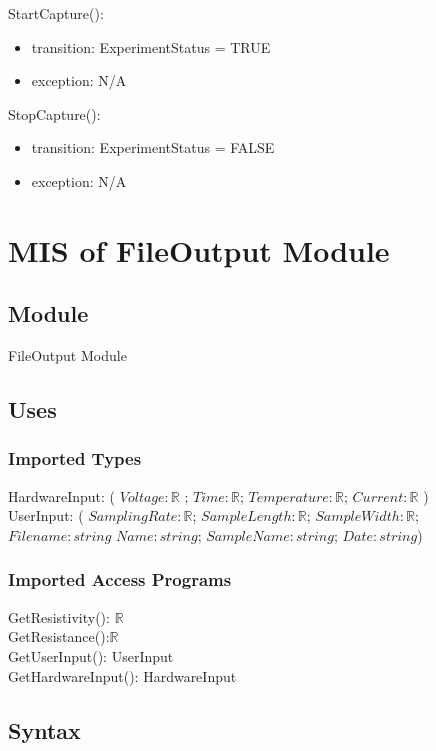 \documentclass[12pt, titlepage]{article}
\begin{document}
\noindent StartCapture():
\begin{itemize}
\item transition: ExperimentStatus = TRUE
\item exception: N/A
\end{itemize}

\noindent StopCapture():
\begin{itemize}
\item transition: ExperimentStatus = FALSE
\item exception: N/A
\end{itemize}

\newpage

\section{MIS of FileOutput Module} \label{FO} 

\subsection{Module}

FileOutput Module

\subsection{Uses}

\subsubsection{Imported Types}

HardwareInput: ( $Voltage: \mathbb{R} $ ; $Time: \mathbb{R}$; $Temperature: \mathbb{R}$; $Current: \mathbb{R}$ )\\
UserInput: ( $SamplingRate: \mathbb{R}$; $SampleLength: \mathbb{R}$; $SampleWidth: \mathbb{R}$; $Filename: string$ $Name: string$; $SampleName: string$; $Date: string$)

\subsubsection{Imported Access Programs}
  GetResistivity(): $\mathbb{R}$\\
  GetResistance():$\mathbb{R}$\\
  GetUserInput(): UserInput\\
  GetHardwareInput(): HardwareInput

\subsection{Syntax}
\end{document}
